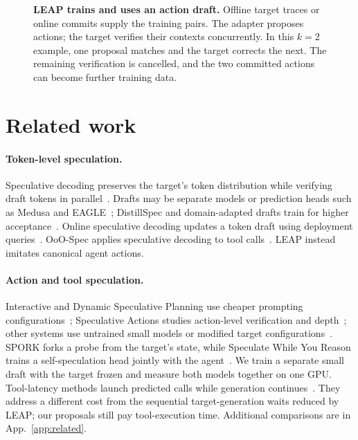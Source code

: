 \begin{figure}[tbp]
\centering
\resizebox{\mainfigwidth}{!}{}
\caption{\textbf{LEAP trains and uses an action draft.} Offline target traces or online commits supply
the training pairs. The adapter proposes actions; the target verifies their contexts concurrently.
In this $k=2$ example, one proposal matches and the target corrects the next. The remaining
verification is cancelled, and the two committed actions can become further training data.}
\label{fig:loop}
\end{figure}

\section{Related work}
\label{sec:related}
\paragraph{Token-level speculation.}
Speculative decoding preserves the target's token distribution while verifying draft tokens in
parallel~\citep{leviathan2023,chen2023}. Drafts may be separate models or prediction heads such as
Medusa and EAGLE~\citep{medusa,eagle}; DistillSpec and domain-adapted drafts train for higher
acceptance~\citep{distillspec,domaindraft}. Online speculative decoding updates a token draft using
deployment queries~\citep{osd}. OoO-Spec applies speculative decoding to tool calls~\citep{ooospec}. LEAP instead imitates canonical agent actions. 

\paragraph{Action and tool speculation.}
Interactive and Dynamic Speculative Planning use cheaper prompting configurations~\citep{isp,dsp};
Speculative Actions studies action-level verification and depth~\citep{specactions}; other systems
use untrained small models or modified target configurations~\citep{smc,spagent,dualspec}.
SPORK forks a probe from the target's state, while Speculate While You Reason trains a
self-speculation head jointly with the agent~\citep{spork,swyr}. We train a separate small draft with
the target frozen and measure both models together on one GPU.
Tool-latency methods launch predicted calls while generation continues~\citep{stc,paste,swm,aospec}.
They address a different cost from the sequential target-generation waits reduced by LEAP; our
proposals still pay tool-execution time. Additional comparisons are in App.~\ref{app:related}.

